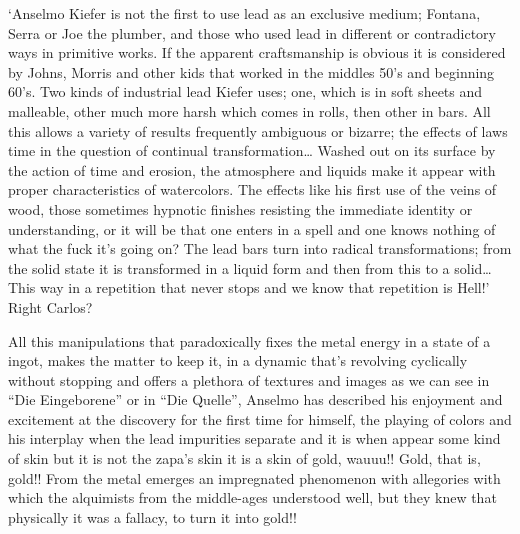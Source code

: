 \documentclass[smalldemyvopaper,11pt,twoside,onecolumn,openright,extrafontsizes]{memoir}
\begin{document}
‘Anselmo Kiefer is not the first to use lead as an exclusive medium; Fontana, Serra or Joe the plumber, and those who used lead in different or contradictory ways in primitive works. If the apparent craftsmanship is obvious it is considered by Johns, Morris and other kids that worked in the middles 50’s and beginning 60’s. Two kinds of industrial lead Kiefer uses; one, which is in soft sheets and malleable, other much more harsh which comes in rolls, then other in bars. All this allows a variety of results frequently ambiguous or bizarre; the effects of laws time in the question of continual transformation… Washed out on its surface by the action of time and erosion, the atmosphere and liquids make it appear with proper characteristics of watercolors. The effects like his first use of the veins of wood, those sometimes hypnotic finishes resisting the immediate identity or understanding, or it will be that one enters in a spell and one knows nothing of what the fuck it’s going on? The lead bars turn into radical transformations; from the solid state it is transformed in a liquid form and then from this to a solid… This way in a repetition that never stops and we know that repetition is Hell!’ Right Carlos?

All this manipulations that paradoxically fixes the metal energy in a state of a ingot, makes the matter to keep it, in a dynamic that’s revolving cyclically without stopping and offers a plethora of textures and images as we can see in “Die Eingeborene” or in “Die Quelle”, Anselmo has described his enjoyment and excitement at the discovery for the first time for himself, the playing of colors and his interplay when the lead impurities separate and it is when appear some kind of skin but it is not the zapa’s skin it is a skin of gold, wauuu!! Gold, that is, gold!! From the metal emerges an impregnated phenomenon with allegories with which the alquimists from the middle-ages understood well, but they knew that physically it was a fallacy, to turn it into gold!!
\end{document}
